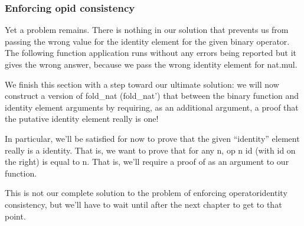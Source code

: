 \documentclass[letterpaper,10pt,english]{sphinxmanual}
\begin{document}
\subsubsection{Enforcing op\sphinxhyphen{}id consistency}
\label{\detokenize{A_03_Recursive_Types:enforcing-op-id-consistency}}
\sphinxAtStartPar
Yet a problem remains. There is nothing in our
solution that prevents us from passing the wrong
value for the identity element for the given binary
operator. The following function application runs
without any errors being reported but it gives the
wrong answer, because we pass the wrong identity
element for nat.mul.

\begin{sphinxVerbatim}[commandchars=\\\{\}]
    \PYG{o}{[}\PYG{o}{]}  
\end{sphinxVerbatim}

\sphinxAtStartPar
We finish this section with a step toward our
ultimate solution: we will now construct a version
of fold\_nat (fold\_nat’) that 
between the binary function and identity element
arguments by requiring, as an additional argument,
a proof that the putative identity element really
is one!

\sphinxAtStartPar
In particular, we’ll be satisfied for now to prove
that the given “identity” element really is a 
identity.  That is, we want to prove that for any n,
op n id (with id on the right) is equal to n. That is,
we’ll require a proof of  as
an argument to our function.

\sphinxAtStartPar
This is not our complete solution to the problem of
enforcing operator\sphinxhyphen{}identity consistency, but we’ll
have to wait until after the next chapter to get to
that point.

\begin{sphinxVerbatim}[commandchars=\\\{\}]
 
       
   
             
     
   
      
\end{sphinxVerbatim}
\end{document}
